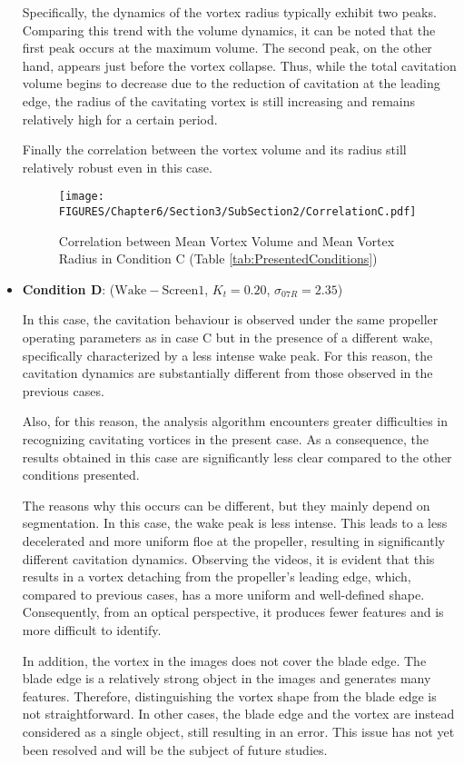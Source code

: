 \begin{itemize}
    Specifically, the dynamics of the vortex radius typically exhibit two peaks. Comparing this trend with the volume dynamics, it can be noted that the first peak occurs at the maximum volume. The second peak, on the other hand, appears just before the vortex collapse. Thus, while the total cavitation volume begins to decrease due to the reduction of cavitation at the leading edge, the radius of the cavitating vortex is still increasing and remains relatively high for a certain period.  

    Finally the correlation between the vortex volume and its radius still relatively robust even in this case.

    \begin{figure}[h] 
        \centering
        \texttt{[image: FIGURES/Chapter6/Section3/SubSection2/CorrelationC.pdf]}
        \caption{Correlation between Mean Vortex Volume and Mean Vortex Radius in Condition C (Table \ref{tab:PresentedConditions})}
        \label{fig:CorrelationC}
    \end{figure}

    \item \textbf{Condition D}: ($\mathrm{Wake-Screen1}$, $K_t = 0.20$, $\sigma_{07R} = 2.35$)
    
    In this case, the cavitation behaviour is observed under the same propeller operating parameters as in case C but in the presence of a different wake, specifically characterized by a less intense wake peak. For this reason, the cavitation dynamics are substantially different from those observed in the previous cases.
    
    Also, for this reason, the analysis algorithm encounters greater difficulties in recognizing cavitating vortices in the present case.  
    As a consequence, the results obtained in this case are significantly less clear compared to the other conditions presented.

    The reasons why this occurs can be different, but they mainly depend on segmentation. In this case, the wake peak is less intense. This leads to a less decelerated and more uniform floe at the propeller, resulting in significantly different cavitation dynamics.
    Observing the videos, it is evident that this results in a vortex detaching from the propeller's leading edge, which, compared to previous cases, has a more uniform and well-defined shape. Consequently, from an optical perspective, it produces fewer features and is more difficult to identify.

    In addition, the vortex in the images does not cover the blade edge.  
    The blade edge is a relatively strong object in the images and generates many features. Therefore, distinguishing the vortex shape from the blade edge is not straightforward. 
    In other cases, the blade edge and the vortex are instead considered as a single object, still resulting in an error.  
    This issue has not yet been resolved and will be the subject of future studies.


\end{itemize}
